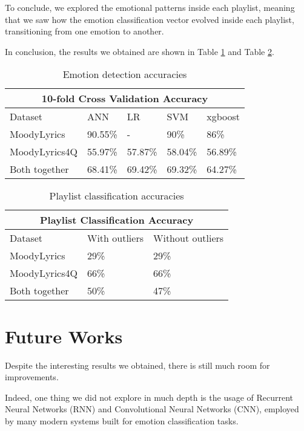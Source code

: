 To conclude, we explored the emotional patterns inside each playlist, meaning that we saw how the emotion
classification vector evolved inside each playlist, transitioning from one emotion to another.

In conclusion, the results we obtained are shown in Table \ref{tab:compar6} and Table \ref{tab:compar62}.

\begin{table}[H]
\centering
\begin{tabular}{ |p{3cm}||p{1.5cm}|p{1.5cm}|p{1.5cm}|p{1.5cm}|  }
 \hline
 \multicolumn{5}{|c|}{10-fold Cross Validation Accuracy} \\
 \hline
 Dataset & ANN & LR &SVM & xgboost\\
 \hline
MoodyLyrics  & 90.55\%    &- &  90\% & 86\%\\
MoodyLyrics4Q  & 55.97\%    &57.87\% &  58.04\% & 56.89\%\\
Both together &   68.41\%  & 69.42\%   &69.32\% &64.27\%\\
\hline
\end{tabular}
\caption{Emotion detection accuracies} \label{tab:compar6}
\end{table}

\begin{table}[H]
\centering
\begin{tabular}{ |p{3cm}||p{1.5cm}|p{1.5cm}| }
 \hline
 \multicolumn{3}{|c|}{Playlist Classification Accuracy} \\
 \hline
Dataset & With outliers & Without outliers\\
 \hline
MoodyLyrics & 29\% & 29\%\\
MoodyLyrics4Q  & 66\%    &66\%\\
Both together &   50\%  & 47\%\\
\hline
\end{tabular}
\caption{Playlist classification accuracies} \label{tab:compar62}
\end{table}


\section{Future Works}

Despite the interesting results we obtained, there is still much room
for improvements.

Indeed, one thing we did not explore in much depth is the usage of Recurrent 
Neural Networks (RNN) and Convolutional Neural Networks (CNN), employed by
many modern systems built for emotion classification tasks.

